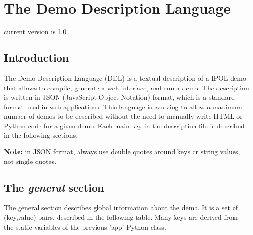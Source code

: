 \section{The Demo Description Language}

current version is 1.0

\subsection{Introduction}
The Demo Description Language (DDL) is a textual description of a IPOL demo that 
allows to compile, generate a web interface, and run a demo. The description is 
written in JSON (JavaScript Object Notation) format, which is a standard format 
used in web applications. This language is evolving to allow a maximum number 
of demos to be described without the need to manually write HTML or Python code 
for a given demo. Each main key in the description file is described in the 
following sections.


{\bf Note:} in JSON format, always use double quotes around keys or string 
values, not single quotes.



\subsection{The \emph{general} section}
The general section describes global information about the demo. It is a set of 
(key,value) pairs, described in the following table. Many keys are derived from 
the static variables of the previous 'app' Python class.

